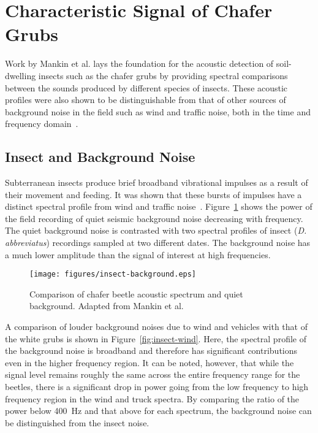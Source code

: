 \documentclass[twocolumn]{article}
\begin{document}
\section{Characteristic Signal of Chafer Grubs}
Work by Mankin et al. lays the foundation for the acoustic detection of soil-dwelling insects such as the chafer grubs by providing spectral comparisons between the sounds produced by different species of insects. These acoustic profiles were also shown to be distinguishable from that of other sources of background noise in the field such as wind and traffic noise, both in the time and frequency domain~\cite{mankin_mccoy_shapiro_1998}.

\subsection{Insect and Background Noise}
Subterranean insects produce brief broadband vibrational impulses as a result of their movement and feeding. It was shown that these bursts of impulses have a distinct spectral profile from wind and traffic noise~\cite{sanders_mankin_liburd_stelinski_2011}. Figure~\ref{fig:insect-background} shows the power of the field recording of quiet seismic background noise decreasing with frequency. The quiet background noise is contrasted with two spectral profiles of insect (\textit{D. abbreviatus}) recordings sampled at two different dates. The background noise has a much lower amplitude than the signal of interest at high frequencies.

\begin{figure}
    \centering
    \texttt{[image: figures/insect-background.eps]}
    \caption{Comparison of chafer beetle acoustic spectrum and quiet background. Adapted from Mankin et al.~\cite{mankin_mccoy_shapiro_1998}}
    \label{fig:insect-background}
\end{figure}

A comparison of louder background noises due to wind and vehicles with that of the white grubs is shown in Figure~\ref{fig:insect-wind}. Here, the spectral profile of the background noise is broadband and therefore has significant contributions even in the higher frequency region. It can be noted, however, that while the signal level remains roughly the same across the entire frequency range for the beetles, there is a significant drop in power going from the low frequency to high frequency region in the wind and truck spectra. By comparing the ratio of the power below \SI{400}{Hz} and that above for each spectrum, the background noise can be distinguished from the insect noise.
\end{document}
